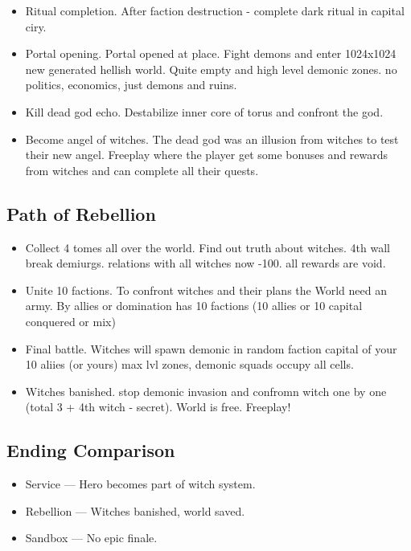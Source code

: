 \begin{itemize}
\item Ritual completion. After faction destruction - complete dark ritual in capital ciry. 
\item Portal opening. Portal opened at place. Fight demons and enter 1024x1024 new generated hellish world. Quite empty and high level demonic zones. no politics, economics, just demons and ruins.
\item Kill dead god echo. Destabilize inner core of torus and confront the god. 
\item Become angel of witches. The dead god was an illusion from witches to test their new angel. Freeplay where the player get some bonuses and rewards from witches and can complete all their quests.
\end{itemize}



\subsection{Path of Rebellion}

\begin{itemize}
\item Collect 4 tomes all over the world. Find out truth about witches. 4th wall break demiurgs. relations with all witches now -100. all rewards are void.
\item Unite 10 factions. To confront witches and their plans the World need an army. By allies or domination has 10 factions (10 allies or 10 capital conquered or mix)
\item Final battle. Witches will spawn demonic in random faction capital of your 10 aliies (or yours) max lvl zones, demonic squads occupy all cells.
\item Witches banished. stop demonic invasion and confromn witch one by one (total 3 + 4th witch - secret). World is free. Freeplay!
\end{itemize}



\subsection{Ending Comparison}

\begin{itemize}
\item Service — Hero becomes part of witch system.
\item Rebellion — Witches banished, world saved.
\item Sandbox — No epic finale.
\end{itemize}



